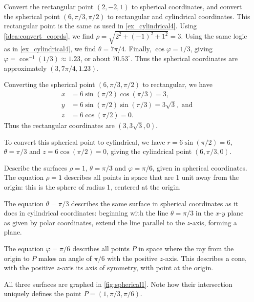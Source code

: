 \begin{example}\label{ex_spherical4}
Convert the rectangular point $(2,-2,1)$ to spherical coordinates, and convert the spherical point $(6,\pi/3,\pi/2)$ to rectangular and cylindrical coordinates.
\solution
This rectangular point is the same as used in \autoref{ex_cylindrical4}. Using \autoref{idea:convert_coords}, we find $\rho = \sqrt{2^2+(-1)^2+1^2} = 3$. Using the same logic as in \autoref{ex_cylindrical4}, we find $\theta = 7\pi/4$. Finally, $\cos\varphi = 1/3$, giving $\varphi = \cos^{-1}(1/3) \approx 1.23$, or about $70.53^\circ$. Thus the spherical coordinates are approximately $(3,7\pi/4,1.23)$.

Converting the spherical point $(6,\pi/3,\pi/2)$ to rectangular, we have
\begin{align*}
 x &= 6\sin(\pi/2)\cos(\pi/3) = 3,\\
 y &= 6\sin(\pi/2)\sin(\pi/3) = 3\sqrt{3},\text{ and}\\
 z &= 6\cos(\pi/2) = 0.
\end{align*}
Thus the rectangular coordinates are $(3,3\sqrt{3},0)$.

To convert this spherical point to cylindrical, we have $r = 6\sin(\pi/2) = 6$, $\theta = \pi/3$ and $z = 6\cos(\pi/2) =0$, giving the cylindrical point $(6,\pi/3,0)$.
\end{example}

\begin{example}\label{ex_spherical1}
Describe the surfaces $\rho=1$, $\theta = \pi/3$ and $\varphi = \pi/6$, given in spherical coordinates.
%
%
\solution
The equation $\rho = 1$ describes all points in space that are 1 unit away from the origin: this is the sphere of radius 1, centered at the origin.

The equation $\theta = \pi/3$ describes the same surface in spherical coordinates as it does in cylindrical coordinates: beginning with the line $\theta = \pi/3$ in the $x$-$y$ plane as given by polar coordinates, extend the line parallel to the $z$-axis, forming a plane.

The equation $\varphi=\pi/6$ describes all points $P$ in space where the ray from the origin to $P$ makes an angle of $\pi/6$ with the positive $z$-axis. This describes a cone, with the positive $z$-axis its axis of symmetry, with point at the origin.

All three surfaces are graphed in \autoref{fig:spherical1}. Note how their intersection uniquely defines the point $P=(1,\pi/3,\pi/6)$.
\end{example}

